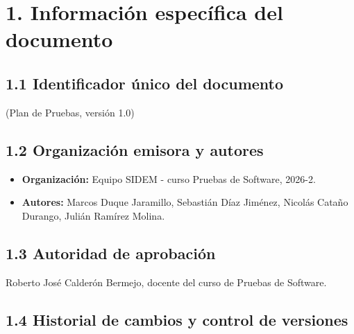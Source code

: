 \documentclass[11pt,a4paper,oneside]{report}
\newcommand{\code}[1]{\leavevmode{\ttfamily\color{tinta}#1}}
\begin{document}
\section*{1. Información específica del documento}

\subsection*{1.1 Identificador único del documento}

\code{SIDEM-\allowbreak{}PP-\allowbreak{}2026-\allowbreak{}01} (Plan de Pruebas, versión 1.0)


\subsection*{1.2 Organización emisora y autores}

\begin{itemize}
\item \textbf{Organización:} Equipo SIDEM - curso Pruebas de Software, 2026-2.
\item \textbf{Autores:} Marcos Duque Jaramillo, Sebastián Díaz Jiménez, Nicolás Cataño Durango, Julián Ramírez Molina.
\end{itemize}

\subsection*{1.3 Autoridad de aprobación}

Roberto José Calderón Bermejo, docente del curso de Pruebas de Software.


\Needspace{150pt}\subsection*{1.4 Historial de cambios y control de versiones}
\end{document}

